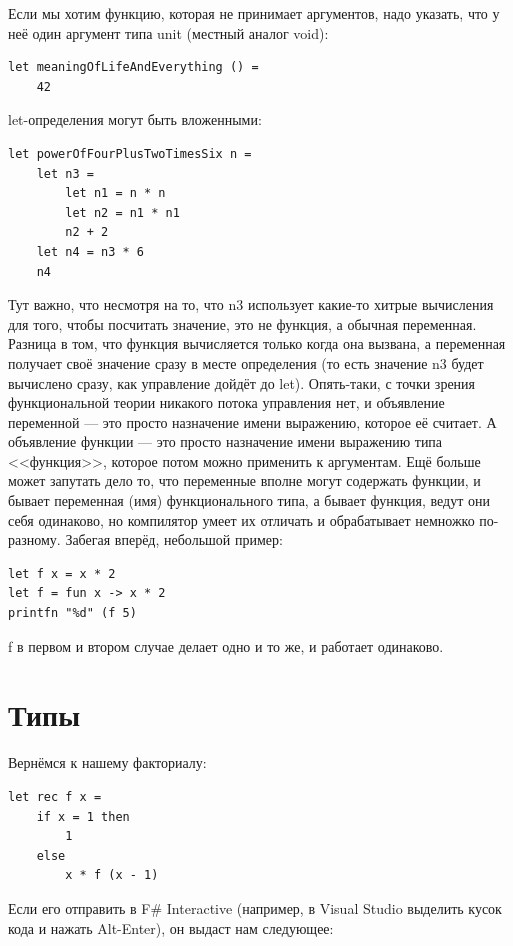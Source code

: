 \documentclass{../../text-style}
\begin{document}
Если мы хотим функцию, которая не принимает аргументов, надо указать, что у неё один аргумент типа unit (местный аналог void):

\begin{verbatim}
let meaningOfLifeAndEverything () =
    42
\end{verbatim}

let-определения могут быть вложенными:
\begin{verbatim}
let powerOfFourPlusTwoTimesSix n =
    let n3 =
        let n1 = n * n
        let n2 = n1 * n1
        n2 + 2
    let n4 = n3 * 6
    n4
\end{verbatim}

Тут важно, что несмотря на то, что n3 использует какие-то хитрые вычисления для того, чтобы посчитать значение, это не функция, а обычная переменная. Разница в том, что функция вычисляется только когда она вызвана, а переменная получает своё значение сразу в месте определения (то есть значение n3 будет вычислено сразу, как управление дойдёт до let). Опять-таки, с точки зрения функциональной теории никакого потока управления нет, и объявление переменной --- это просто назначение имени выражению, которое её считает. А объявление функции --- это просто назначение имени выражению типа <<функция>>, которое потом можно применить к аргументам. Ещё больше может запутать дело то, что переменные вполне могут содержать функции, и бывает переменная (имя) функционального типа, а бывает функция, ведут они себя одинаково, но компилятор умеет их отличать и обрабатывает немножко по-разному. Забегая вперёд, небольшой пример:

\begin{verbatim}
let f x = x * 2
let f = fun x -> x * 2
printfn "%d" (f 5)
\end{verbatim}

f в первом и втором случае делает одно и то же, и работает одинаково.

\section{Типы}

Вернёмся к нашему факториалу:

\begin{verbatim}
let rec f x =
    if x = 1 then
        1
    else
        x * f (x - 1)
\end{verbatim}

Если его отправить в F\# Interactive (например, в Visual Studio выделить кусок кода и нажать Alt-Enter), он выдаст нам следующее:
\end{document}
